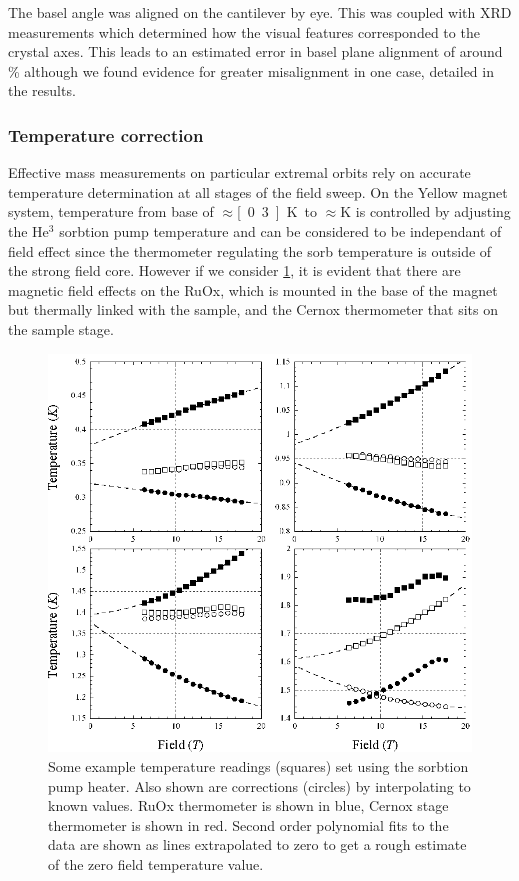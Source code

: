 The basel angle was aligned on the cantilever by eye. This was coupled with XRD measurements which determined how the visual features corresponded to the crystal axes. This leads to an estimated error in basel plane alignment of around \unit[5]{\%} although we found evidence for greater misalignment in one case, detailed in the results.

\subsubsection{Temperature correction}
    \label{Sec:2:TemepratureCorrection}

Effective mass measurements on particular extremal orbits rely on accurate temperature determination at all stages of the field sweep. On the Yellow magnet system, temperature from base of $\approx$\unit[0.3]{K} to $\approx$\unit[2]{K} is controlled by adjusting the He$^3$ sorbtion pump temperature and can be considered to be independant of field effect since the thermometer regulating the sorb temperature is outside of the strong field core. However if we consider \fig\ref{Fig:2:TemperatureCorrection}, it is evident that there are magnetic field effects on the RuOx, which is mounted in the base of the magnet but thermally linked with the sample, and the Cernox thermometer that sits on the sample stage.
\begin{figure}[htbp]
    \begin{center}
        \includegraphics[scale=0.9]{Chapter3-dHvABaFe2P2/Figures/Mass/TemperatureCorrection/TemperatureCorrection}
        \caption{Some example temperature readings (squares) set using the sorbtion pump heater. Also shown are corrections (circles) by interpolating to known values. RuOx thermometer is shown in blue, Cernox stage thermometer is shown in red. Second order polynomial fits to the data are shown as lines extrapolated to zero to get a rough estimate of the zero field temperature value.}
        \label{Fig:2:TemperatureCorrection}
    \end{center}
\end{figure}
